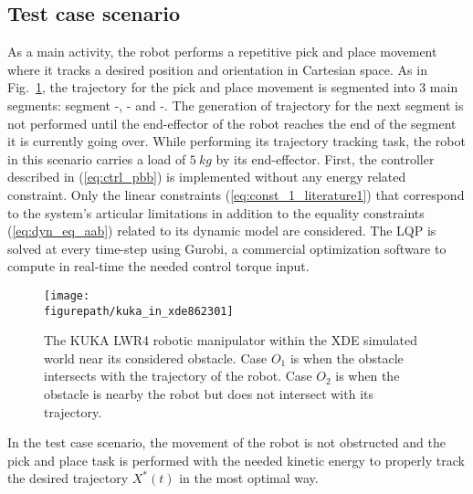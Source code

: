 \subsection{Test case scenario}
As a main activity, the robot performs a repetitive pick and place movement where it tracks a desired position and orientation in Cartesian space. As in Fig.~\ref{fig:kuka_in_xde862301_a}, the trajectory for the pick and place movement is segmented into 3 main segments: segment -, - and -. The generation of trajectory for the next segment is not performed until the end-effector of the robot reaches the end of the segment it is currently going over. While performing its trajectory tracking task, the robot in this scenario carries a load of $5~kg$ by its end-effector. First, the controller described in (\ref{eq:ctrl_pbb}) is implemented without any energy related constraint. Only the linear constraints (\ref{eq:const_1_literature1}) that correspond to the system's articular limitations in addition to the equality constraints (\ref{eq:dyn_eq_aab}) related to its dynamic model are considered. The LQP is solved at every time-step using Gurobi, a commercial optimization software \cite{gurobi} to compute in real-time the needed control torque input.
\begin{figure}[h]
\centering
{\texttt{[image: \\figurepath/kuka\_in\_xde862301]}}
\caption{The KUKA LWR4 robotic manipulator within the XDE simulated world near its considered obstacle. Case $O_1$ is when the obstacle intersects with the trajectory of the robot. Case $O_2$ is when the obstacle is nearby the robot but does not intersect with its trajectory.} 
\label{fig:kuka_in_xde862301_a}
\end{figure}
In the test case scenario, the movement of the robot is not obstructed and the pick and place task is performed with the needed kinetic energy to properly track the desired trajectory $X^*(t)$ in the most optimal way. 
